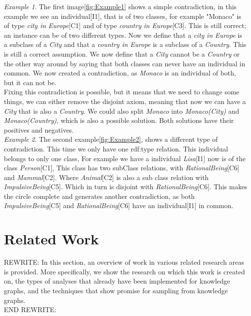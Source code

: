\documentclass[11pt,letterpaper ,oneside ]{book}
\begin{document}
	\textit{Example 1}. The first image\ref{fig:Example1} shows a simple contradiction, in this example we see an individual[I1], that is of two classes, for example "Monaco" is of type \textit{city in Europe}[C1] and of type \textit{country in Europe}[C3]. This is still correct; an instance can be of two different types. Now we define that a \textit{city in Europe} is a subclass of a \textit{City} and that a \textit{country in Europe} is a subclass of a \textit{Country}. This is still a correct assumption. We now define that a \textit{City} cannot be a \textit{Country} or the other way around by saying that both classes can never have an individual in common. We now created a contradiction, as \textit{Monaco} is an individual of both, but it can not be.\\
	
	Fixing this contradiction is possible, but it means that we need to change some things, we can either remove the disjoint axiom, meaning that now we can have a \textit{City} that is also a \textit{Country}. We could also split \textit{Monaco} into \textit{Monaco(City)} and \textit{Monaco(Country)}, which is also a possible solution. Both solutions have their positives and negatives.\\
	
	\textit{Example 2}. The second example\ref{fig:Example2}, shows a different type of contradiction. This time we only have one rdf:type relation. This individual belongs to only one class, For example we have a individual \textit{Lisa}[I1] now is of the class \textit{Person}[C1], This class has two subClass relations, with \textit{RationalBeing}[C6] and \textit{Mammal}[C2]. Where \textit{Animal}[C2] is also a sub class relation with \textit{ImpulsiveBeing}[C5]. Which in turn is disjoint with \textit{RationalBeing}[C6]. This makes the circle complete and generates another contradiction, as both \textit{ImpulsiveBeing}[C5] and \textit{RationalBeing}[C6] have an individual[I1] in common. \\
	
	
	\chapter{Related Work}\label{RelatedWork}
	REWRITE:
	In this section, an overview of work in various related research areas is provided. More specifically, we show the research on which this work is created on, the types of analyses that already have been implemented for knowledge graphs, and the techniques that show promise for sampling from knowledge graphs. \\
	END REWRITE:
	
\end{document}
